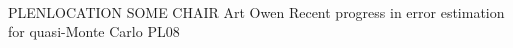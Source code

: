 	\\\hline
	{PLENLOCATION}	%
	{SOME CHAIR}		%
	{Art Owen}	%
	{Recent progress in error estimation for quasi-Monte Carlo}		%
	{PL08}			%
	\\\hline
